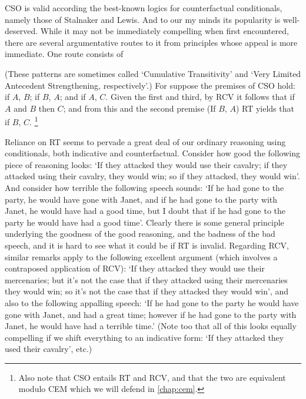 \documentclass[If.tex]{subfiles}
\begin{document}
CSO is valid according the best-known logics for counterfactual conditionals, namely those of Stalnaker and Lewis. And to our my minds its popularity is well-deserved. While it may not be immediately compelling when first encountered, there are several argumentative routes to it from principles whose appeal is more immediate. One route consists of
\begin{prop}  
	\litem[RT] 
	\litem[RCV] 
\end{prop}
(These patterns are sometimes called ‘Cumulative Transitivity’ and ‘Very Limited Antecedent Strengthening, respectively’.)  For suppose the premises of CSO hold: if $A$, $B$; if $B$, $A$; and if $A$, $C$. Given the first and third, by RCV it follows that if $A$ and $B$ then $C$; and from this and the second premise (If $B$, $A$) RT yields that if $B$, $C$.%
\footnote{Also note that CSO entails RT and RCV, and that the two are equivalent modulo CEM which we will defend in \autoref{chap:cem}.}

Reliance on RT seems to pervade a great deal of our ordinary reasoning using conditionals, both indicative and counterfactual. Consider how good the following piece of reasoning looks: ‘If they attacked they would use their cavalry; if they attacked using their cavalry, they would win; so if they attacked, they would win’. And consider how terrible the following speech sounds: ‘If he had gone to the party, he would have gone with Janet, and if he had gone to the party with Janet, he would have had a good time, but I doubt that if he had gone to the party he would have had a good time’. Clearly there is some general principle underlying the goodness of the good reasoning, and the badness of the bad speech, and it is hard to see what it could be if RT is invalid. Regarding RCV, similar remarks apply to the following excellent argument (which involves a contraposed application of RCV): ‘If they attacked they would use their mercenaries; but it's not the case that if they attacked using their mercenaries they would win; so it's not the case that if they attacked they would win’, and also to the following appalling speech: ‘If he had gone to the party he would have gone with Janet, and had a great time; however if he had gone to the party with Janet, he would have had a terrible time.’ (Note too that all of this looks equally compelling if we shift everything to an indicative form: ‘If they attacked they used their cavalry’, etc.)
\end{document}
